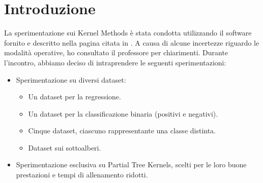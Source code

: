 \section{Introduzione}

La sperimentazione sui Kernel Methods è stata condotta utilizzando il software 
fornito e descritto nella pagina citata in \cite{kernel}. A causa di alcune 
incertezze riguardo le modalità operative, ho consultato il professore per 
chiarimenti. Durante l'incontro, abbiamo deciso di intraprendere le seguenti 
sperimentazioni:

\begin{itemize}
    \item Sperimentazione su diversi dataset:
    \begin{itemize}
        \item Un dataset per la regressione.
        \item Un dataset per la classificazione binaria (positivi e negativi).
        \item Cinque dataset, ciascuno rappresentante una classe distinta.
        \item Dataset sui sottoalberi.
    \end{itemize}
    \item Sperimentazione esclusiva su Partial Tree Kernels, scelti per le loro 
    buone prestazioni e tempi di allenamento ridotti.
\end{itemize}

